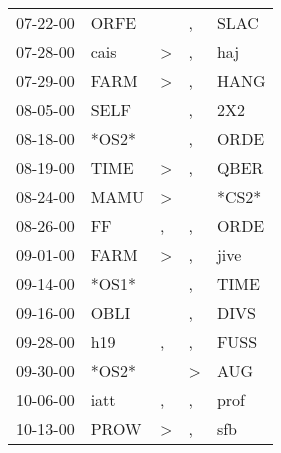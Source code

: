 \begin{supertabular}{p{0.07\textwidth}p{0.06\textwidth}p{0.02\textwidth}p{0.02\textwidth}p{0.06\textwidth}}
          07-22-00\textsuperscript{} &           ORFE\textsuperscript{} &                  &             , &           SLAC\textsuperscript{} \\
          07-28-00\textsuperscript{} &           cais\textsuperscript{} &     \textgreater &             , &            haj\textsuperscript{} \\
          07-29-00\textsuperscript{} &           FARM\textsuperscript{} &     \textgreater &             , &           HANG\textsuperscript{} \\
          08-05-00\textsuperscript{} &           SELF\textsuperscript{} &                  &             , &            2X2\textsuperscript{} \\
          08-18-00\textsuperscript{} &                            *OS2* &                  &             , &           ORDE\textsuperscript{} \\
          08-19-00\textsuperscript{} &           TIME\textsuperscript{} &     \textgreater &             , &           QBER\textsuperscript{} \\
          08-24-00\textsuperscript{} &           MAMU\textsuperscript{} &     \textgreater &               &                            *CS2* \\
          08-26-00\textsuperscript{} &             FF\textsuperscript{} &                , &             , &           ORDE\textsuperscript{} \\
          09-01-00\textsuperscript{} &           FARM\textsuperscript{} &     \textgreater &             , &           jive\textsuperscript{} \\
          09-14-00\textsuperscript{} &                            *OS1* &                  &             , &           TIME\textsuperscript{} \\
          09-16-00\textsuperscript{} &           OBLI\textsuperscript{} &                  &             , &           DIVS\textsuperscript{} \\
          09-28-00\textsuperscript{} &            h19\textsuperscript{} &                , &             , &           FUSS\textsuperscript{} \\
          09-30-00\textsuperscript{} &                            *OS2* &                  &  \textgreater &            AUG\textsuperscript{} \\
          10-06-00\textsuperscript{} &           iatt\textsuperscript{} &                , &             , &           prof\textsuperscript{} \\
          10-13-00\textsuperscript{} &           PROW\textsuperscript{} &     \textgreater &             , &            sfb\textsuperscript{} \\

\end{supertabular}
